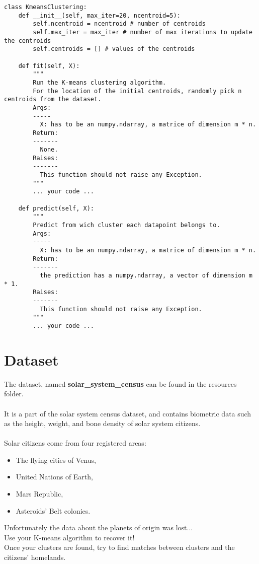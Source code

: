 \begin{verbatim}
class KmeansClustering:
    def __init__(self, max_iter=20, ncentroid=5):
        self.ncentroid = ncentroid # number of centroids
        self.max_iter = max_iter # number of max iterations to update the centroids
        self.centroids = [] # values of the centroids
        
    def fit(self, X):
        """
        Run the K-means clustering algorithm.
        For the location of the initial centroids, randomly pick n centroids from the dataset.
        Args:
        -----
          X: has to be an numpy.ndarray, a matrice of dimension m * n.
        Return:
        -------
          None.
        Raises:
        -------
          This function should not raise any Exception.
        """
        ... your code ...

    def predict(self, X):
        """
        Predict from wich cluster each datapoint belongs to.
        Args:
        -----
          X: has to be an numpy.ndarray, a matrice of dimension m * n.
        Return:
        -------
          the prediction has a numpy.ndarray, a vector of dimension m * 1.
        Raises:
        -------
          This function should not raise any Exception.
        """
        ... your code ...
\end{verbatim}

\section*{Dataset}
The dataset, named \textbf{solar\_system\_census} can be found in
the resources folder.\\
\\
It is a part of the solar system census dataset, and contains biometric
data such as the height, weight, and bone density of solar
system citizens.\\
\\
Solar citizens come from four registered areas:
\begin{itemize}
  \item The flying cities of Venus,
  \item United Nations of Earth,
  \item Mars Republic,
  \item Asteroids' Belt colonies.  
\end{itemize}
Unfortunately the data about the planets of origin was lost...\\
Use your K-means algorithm to recover it!\\
Once your clusters are found, try to find matches between clusters and the citizens' homelands.\\

